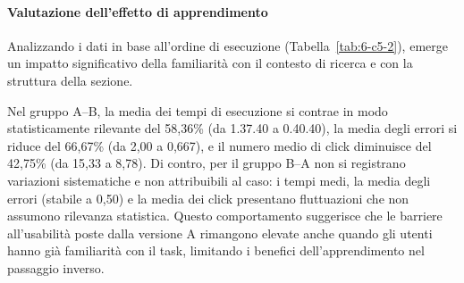 \paragraph{Valutazione dell’effetto di apprendimento}

Analizzando i dati in base all'ordine di esecuzione (Tabella~\ref{tab:6-c5-2}), emerge un impatto significativo della familiarità con il contesto di ricerca e con la struttura della sezione.

Nel gruppo A--B, la media dei tempi di esecuzione si contrae in modo statisticamente rilevante del 58,36\% (da 1.37.40 a 0.40.40), la media degli errori si riduce del 66,67\% (da 2,00 a 0,667), e il numero medio di click diminuisce del 42,75\% (da 15,33 a 8,78). Di contro, per il gruppo B--A non si registrano variazioni sistematiche e non attribuibili al caso: i tempi medi, la media degli errori (stabile a 0,50) e la media dei click presentano fluttuazioni che non assumono rilevanza statistica. Questo comportamento suggerisce che le barriere all'usabilità poste dalla versione A rimangono elevate anche quando gli utenti hanno già familiarità con il task, limitando i benefici dell'apprendimento nel passaggio inverso.


